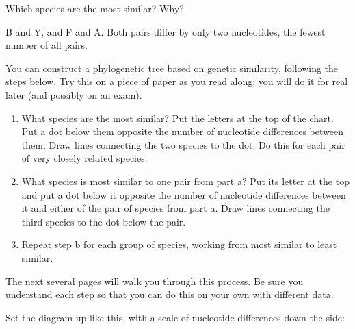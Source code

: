 \documentclass[12pt, addpoints]{exam}
\newcommand*\AnswerBox[2]{%
    \parbox[t][#1]{0.92\textwidth}{%
    \begin{solution}#2\end{solution}}
}
\begin{document}
\begin{questions}


\question[2]
Which species are the most similar? Why?

\AnswerBox{5\baselineskip}{%
 B and Y, and F and A. Both pairs differ by only two nucleotides, the fewest number of all pairs.
}

You can construct a phylogenetic tree  based on genetic similarity, following the steps
below. Try this on a piece of paper as you read along; you will do it for
real later (and possibly on an exam). 

\begin{enumerate}[leftmargin=*, label=\alph*.]

\item What species are the most similar? Put the letters at the top of the
chart. Put a dot below them opposite the number of nucleotide
differences between them. Draw lines connecting the two species to the
dot. Do this for each pair of very closely related species.

\item What species is most similar to one pair from part a? Put its letter
at the top and put a dot below it opposite the number of nucleotide
differences between it and either of the pair of species from part a.
Draw lines connecting the third species to the dot below the pair.

\item Repeat step b for each group of species, working from most similar to
least similar.

\end{enumerate}

The next several pages will walk you through this process. Be sure you understand each step so that you can do this on your own with different data.

\newpage

Set the diagram up like this, with a scale of nucleotide differences
down the side:

\end{questions}
\end{document}
